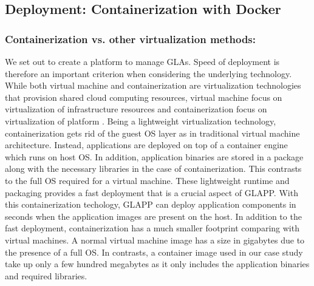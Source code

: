 \documentclass{seal_thesis}
\begin{document}
\subsection{Deployment: Containerization with Docker}
\subsubsection{Containerization vs. other virtualization methods:}
We set out to create a platform to manage GLAs.
Speed of deployment is therefore an important criterion when considering the underlying technology.
While both virtual machine and containerization are virtualization technologies that provision shared cloud computing resources, virtual machine focus on virtualization of infrastructure resources and containerization focus on virtualization of platform .
Being a lightweight virtualization technology, containerization gets rid of the guest OS layer as in traditional virtual machine architecture.
Instead, applications are deployed on top of a container engine which runs on host OS.
In addition, application binaries are stored in a package along with the necessary libraries in the case of containerization.
This contrasts to the full OS required for a virtual machine.
These lightweight runtime and packaging provides a fast deployment that is a crucial aspect of GLAPP.
With this containerization techology, GLAPP can deploy application components in seconds when the application images are present on the host.
In addition to the fast deployment, containerization has a much smaller footprint comparing with virtual machines.
A normal virtual machine image has a size in gigabytes due to the presence of a full OS.
In contrasts, a container image used in our case study take up only a few hundred megabytes as it only includes the application binaries and required libraries.


\end{document}
